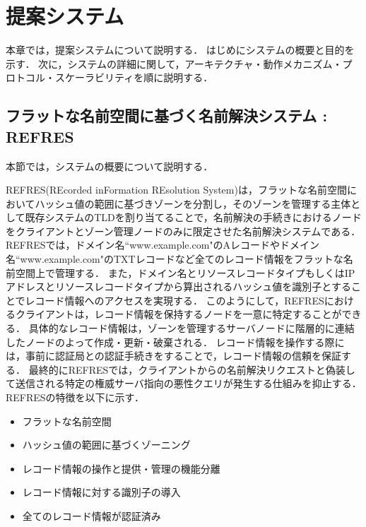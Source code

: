 \section{提案システム}
本章では，提案システムについて説明する．
はじめにシステムの概要と目的を示す．
次に，システムの詳細に関して，アーキテクチャ・動作メカニズム・プロトコル・スケーラビリティを順に説明する．

\subsection{フラットな名前空間に基づく名前解決システム : REFRES}
本節では，システムの概要について説明する．

REFRES(REcorded inFormation REsolution System)は，フラットな名前空間においてハッシュ値の範囲に基づきゾーンを分割し，そのゾーンを管理する主体として既存システムのTLDを割り当てることで，名前解決の手続きにおけるノードをクライアントとゾーン管理ノードのみに限定させた名前解決システムである．
REFRESでは，ドメイン名``www.example.com"のAレコードやドメイン名``www.example.com"のTXTレコードなど全てのレコード情報をフラットな名前空間上で管理する．
また，ドメイン名とリソースレコードタイプもしくはIPアドレスとリソースレコードタイプから算出されるハッシュ値を識別子とすることでレコード情報へのアクセスを実現する．
このようにして，REFRESにおけるクライアントは，レコード情報を保持するノードを一意に特定することができる．
具体的なレコード情報は，ゾーンを管理するサーバノードに階層的に連結したノードのよって作成・更新・破棄される．
レコード情報を操作する際には，事前に認証局との認証手続きをすることで，レコード情報の信頼を保証する．
最終的にREFRESでは，クライアントからの名前解決リクエストと偽装して送信される特定の権威サーバ指向の悪性クエリが発生する仕組みを抑止する．
REFRESの特徴を以下に示す．
\begin{itemize}
 \item フラットな名前空間
 \vspace{-3mm}
 \item ハッシュ値の範囲に基づくゾーニング
 \vspace{-3mm}
 \item レコード情報の操作と提供・管理の機能分離
 \vspace{-3mm}
 \item レコード情報に対する識別子の導入
 \vspace{-3mm}
 \item 全てのレコード情報が認証済み
\end{itemize}

